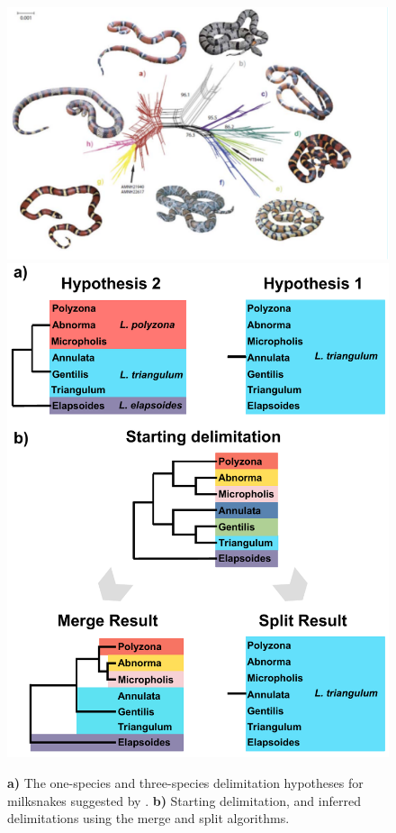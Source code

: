 \documentclass{article1}
\begin{document}
\begin{figure}[t]
    \centering %
    \includegraphics[scale=0.35]{figs/miksnakes} %
    \includegraphics[scale=0.50]{figs/fig-miksnakes-results} %
    
    \caption{\textbf{a)} The one-species and three-species delimitation hypotheses for
    milksnakes suggested by \citet{Chambers2020}.
    \textbf{b)} Starting delimitation, and inferred delimitations using the merge and
    split algorithms. %
} \label{fig:milksnake}
\end{figure} 
\end{document}
